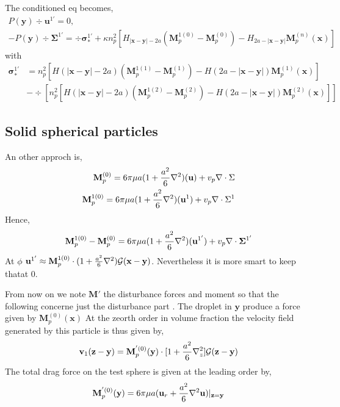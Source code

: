 \documentclass[12pt]{My_preprint}
\begin{document}
The conditioned eq becomes, 
\begin{align}
    P(\textbf{y}) \div \textbf{u}^{1'} = 0, \\
    - P(\textbf{y}) \div \bm\Sigma^{1'}
    = 
    \div\bm\sigma_*^{1'}
    +
    \kappa n_p^2 [H_{|\textbf{x}-\textbf{y}|-2a} (\textbf{M}_{p}^{1(0)} - \textbf{M}_{p}^{(0)})
    -H_{2a - |\textbf{x}-\textbf{y}|} \textbf{M}_{p}^{(n)}(\textbf{x})]
\end{align}
with 
\begin{align}
    \bm\sigma_*^{1'} &= 
    n_p^2 [H(|\textbf{x}-\textbf{y}|-2a) (\textbf{M}_{p}^{1(1)} - \textbf{M}_{p}^{(1)})
    -H(2a - |\textbf{x}-\textbf{y}|) \textbf{M}_{p}^{(1)}(\textbf{x})]\\
    &-\div[
        n_p^2 [H(|\textbf{x}-\textbf{y}|-2a) (\textbf{M}_{p}^{1(2)} - \textbf{M}_{p}^{(2)})
    -H(2a - |\textbf{x}-\textbf{y}|) \textbf{M}_{p}^{(2)}(\textbf{x})]
    ]
\end{align}

\subsection*{Solid spherical particles }
An other approch is, 
\begin{align*}
    \textbf{M}^{(0)}_p
    =
    6\pi\mu a(1 + \frac{a^2}{6}\mathbf{\nabla}^2)(\textbf{u})
    + v_p \mathbf{\nabla}\cdot \Sigma\\
    \textbf{M}^{1(0)}_p
    =
    6\pi\mu a(1 + \frac{a^2}{6}\mathbf{\nabla}^2)(\textbf{u}^1)
    + v_p \mathbf{\nabla}\cdot \Sigma^1
\end{align*}
Hence, 
\begin{equation}
    \textbf{M}^{1(0)}_p
    -\textbf{M}^{(0)}_p
    =
    6\pi\mu a(1 + \frac{a^2}{6}\mathbf{\nabla}^2)(\textbf{u}^{1'})
    + v_p \mathbf{\nabla}\cdot \bm\Sigma^{1'}
\end{equation}
At $\mathcal{\phi}$ $\textbf{u}^{1'} \approx \textbf{M}^{1(0)}_p\cdot (1+\frac{a^2}{6}\mathbf{\nabla}^2)\mathcal{G}(\textbf{x}-\textbf{y})$. 
Nevertheless it is more smart to keep thatat 0. 



From now on we note $\textbf{M}'$ the disturbance forces and moment so that the following concerne just the disturbance part .
The droplet in $\textbf{y}$ produce a force given by $\textbf{M}_p^{(0)}(\textbf{x})$
At the zeorth order in volume fraction the velocity field generated by this particle is thus given by, 
\begin{equation}
    \textbf{v}_1(\textbf{z}-\textbf{y})
    =
    \textbf{M}_p^{'(0)}(\textbf{y})\cdot [1+ \frac{a^2}{6}\mathbf{\nabla}^2_z]\mathcal{G}(\textbf{z}-\textbf{y})
\end{equation}
The total drag force on the test sphere is given at the leading order by,
\begin{equation}
    \textbf{M}_p^{'(0)}(\textbf{y})
    =
    6\pi\mu a (\textbf{u}_r + \frac{a^2}{6}\mathbf{\nabla}^2\textbf{u})|_{\textbf{z}=\textbf{y}}
\end{equation}
\end{document}
